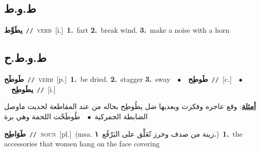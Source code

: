 \documentclass[10pt,a4paper,twoside]{article} %
\begin{document}
\begin{multicols}{2}
\vspace{-3mm}
\subsection*{\color{blue}\foreignlanguage{arabic}{ط.و.ط}\color{blue}{ (ntws)}} 

{\setlength\topsep{0pt}\textbf{\foreignlanguage{arabic}{يطَوِّط}}\ {\color{gray}\texttt{//}\color{black}}\ \textsc{verb}\ [i.]\ \textbf{1.}~fart  \textbf{2.}~break wind.  \textbf{3.}~make a noise with a horn\ } \vspace{2mm}

\vspace{-3mm}
\subsection*{\color{blue}\foreignlanguage{arabic}{ط.و.ط.ح}\color{blue}{}} 

{\setlength\topsep{0pt}\textbf{\foreignlanguage{arabic}{طَوطَح}}\ {\color{gray}\texttt{//}\color{black}}\ \textsc{verb}\ [p.]\ \textbf{1.}~be dried.  \textbf{2.}~stagger  \textbf{3.}~sway\ \ $\bullet$\ \ \setlength\topsep{0pt}\textbf{\foreignlanguage{arabic}{طَوطِح}}\ {\color{gray}\texttt{//}\color{black}}\ [c.]\ \ $\bullet$\ \ \setlength\topsep{0pt}\textbf{\foreignlanguage{arabic}{يطَوطِح}}\ {\color{gray}\texttt{//}\color{black}}\ [i.]\  \begin{flushright}\color{gray}\foreignlanguage{arabic}{\textbf{\underline{\foreignlanguage{arabic}{أمثلة}}}: وقع عاجره وفكزت وبعديها ضل يطُوطِح بحاله من عند المقاطعة لحديت ماوصل الضابطة الجمركية\ $\bullet$\ \  طُوطَحْت اللحمة وهي برة}\end{flushright}\color{black}} \vspace{2mm}

{\setlength\topsep{0pt}\textbf{\foreignlanguage{arabic}{طَوَاطِح}}\ {\color{gray}\texttt{//}\color{black}}\ \textsc{noun}\ [pl.]\ \color{gray}(msa. \foreignlanguage{arabic}{زينة من صدف وخرز تُعَلَّق على البَرْقُع}~\foreignlanguage{arabic}{\textbf{١.}})\color{black}\ \textbf{1.}~the accessories that women hang on the face covering\ } \vspace{2mm}


\end{multicols}
\end{document}
